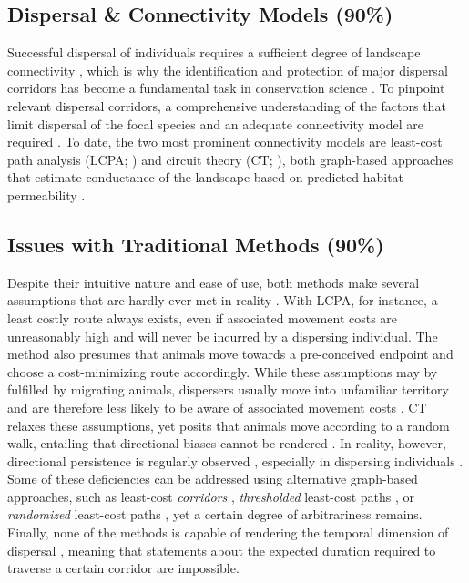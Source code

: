 \documentclass[abstract=on,10pt,a4paper,bibliography=totocnumbered]{article}
\begin{document}
\subsection{Dispersal \& Connectivity Models (90\%)}
Successful dispersal of individuals requires a sufficient degree of landscape
connectivity \citep{Fahrig.2003, Clobert.2012}, which is why the identification
and protection of major dispersal corridors has become a fundamental task in
conservation science \citep{Nathan.2008, Doerr.2011, Rudnick.2012}. To pinpoint
relevant dispersal corridors, a comprehensive understanding of the factors that
limit dispersal of the focal species and an adequate connectivity model are
required \citep{Baguette.2013, Vasudev.2015, Hofmann.2021}. To date, the two
most prominent connectivity models are least-cost path analysis (LCPA;
\citealp{Adriaensen.2003}) and circuit theory (CT; \citealp{McRae.2006,
McRae.2008}), both graph-based approaches that estimate conductance of the
landscape based on predicted habitat permeability \citep{Zeller.2012}.

\subsection{Issues with Traditional Methods (90\%)}
Despite their intuitive nature and ease of use, both methods make several
assumptions that are hardly ever met in reality \citep{Diniz.2020}. With LCPA,
for instance, a least costly route always exists, even if associated movement
costs are unreasonably high and will never be incurred by a dispersing
individual. The method also presumes that animals move towards a pre-conceived
endpoint and choose a cost-minimizing route accordingly. While these assumptions
may by fulfilled by migrating animals, dispersers usually move into unfamiliar
territory and are therefore less likely to be aware of associated movement costs
\citep{Koen.2014, Abrahms.2017, Cozzi.2020}. CT relaxes these assumptions, yet
posits that animals move according to a random walk, entailing that directional
biases cannot be rendered \citep{Diniz.2020}. In reality, however, directional
persistence is regularly observed \citep{Bovet.1991, Schultz.2001}, especially
in dispersing individuals \citep{Cozzi.2020, Hofmann.2021}. Some of these
deficiencies can be addressed using alternative graph-based approaches, such as
least-cost \textit{corridors} \citep{Pinto.2009}, \textit{thresholded}
least-cost paths \citep{Landguth.2012}, or \textit{randomized} least-cost paths
\citep{Panzacchi.2016}, yet a certain degree of arbitrariness remains. Finally,
none of the methods is capable of rendering the temporal dimension of dispersal
\citep{Diniz.2020}, meaning that statements about the expected duration required
to traverse a certain corridor are impossible.
\end{document}
